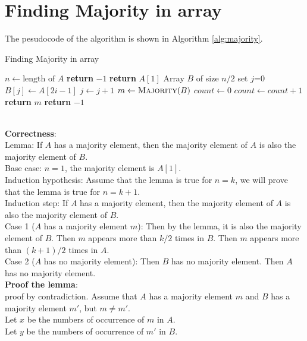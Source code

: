 \documentclass[onecolumn]{report}
\begin{document}
\section{Finding Majority in array}
The pesudocode of the algorithm is shown in Algorithm \ref{alg:majority}.
\begin{algorithm}
\label{alg:majority}
\caption{Finding Majority in array}
\begin{algorithmic}[1]
\State $n \gets \text{length of } A$
\State \textbf{return} $-1$
\EndIf
{}
\State \textbf{return} $A[1]$
\EndIf
{}
\State 
\EndIf
\State Array $B$ of size $n/2$
\State set $j$=0
\State $B[j] \gets A[2i-1]$
\State $j \gets j+1$
\EndIf
\EndFor
\State $m \gets \textsc{Majority}(B)$
\State $count \gets 0$
\State $count \gets count+1$
\EndIf
\EndFor
{}
\State \textbf{return} $m$
\Else
\State \textbf{return} $-1$
\EndIf
\EndProcedure
\end{algorithmic}
\end{algorithm}\\
\textbf{Correctness}:\\
Lemma: If $A$ has a majority element, then the majority element of $A$ is also the majority element of $B$.\\
Base case: $n=1$, the majority element is $A[1]$.\\
Induction hypothesis: Assume that the lemma is true for $n=k$, we will prove that the lemma is true for $n=k+1$.\\
Induction step: If $A$ has a majority element, then the majority element of $A$ is also the majority element of $B$.\\
Case 1 ($A$ has a majority element $m$): Then by the lemma, it is also the majority element of $B$. Then $m$ appears more than $k/2$ times in $B$. Then $m$ appears more than $(k+1)/2$ times in $A$.\\
Case 2 ($A$ has no majority element): Then $B$ has no majority element. Then $A$ has no majority element.\\
\textbf{Proof the lemma}:\\
proof by contradiction. Assume that $A$ has a majority element $m$ and $B$ has a majority element $m'$, but $m \neq m'$. \\
Let $x$ be the numbers of occurrence of $m$ in $A$.\\
Let $y$ be the numbers of occurrence of $m'$ in $B$.\\
\end{document}
